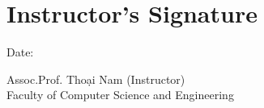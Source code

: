 \chapter*{Instructor’s Signature}

\vspace{1cm}

\makebox[0.7\linewidth][l]{\hrulefill} Date: \makebox[0.2\linewidth][l]{\hrulefill}

    \begin{flushleft}
    Assoc.Prof. Thoại Nam (Instructor)\\
    Faculty of Computer Science and Engineering
    \end{flushleft}